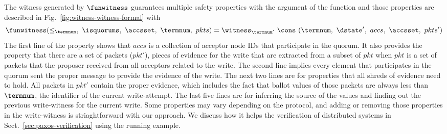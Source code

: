 The witness generated by $\funwitness$ guarantees multiple safety properties with the argument of the function and those properties are described in Fig.~\ref{fig:witness-witness-formal}
with
$$\funwitness(\le_{\termnum},~\isquorums,~\accsset,~\termnum,~pkts) = \witness_{\termnum'} \ \cons \ (\termnum,~\dstate',~accs,~\accsset,~pkts')$$ The first line of the property shows that
$accs$ is a collection of acceptor node IDs that participate in the quorum.
It also provides the property that there are a set of packets ($pkt'$), pieces of evidence for the write that are extracted from a subset of $pkt$ when $pkt$ is a set of packets that the proposer received from all acceptors related to the write. 
The second line implies every element that participates in the quorum sent the proper message to provide the evidence of the write.
The next two lines are for properties that all shreds of evidence need to hold. 
All packets in $pkt'$ contain the proper evidence, which includes the fact that ballot values of those packets are always less than $\termnum$, the identifier of the current write-attempt.
The last five lines are for inferring the source of the values and finding out the previous write-witness for the current write.
Some properties may vary depending on the protocol, and adding or removing those properties in the write-witness is striaghtforward with our approach. We discuss how it helps the verification of distributed systems in Sect.~\ref{sec:paxos-verification} using the running example.
